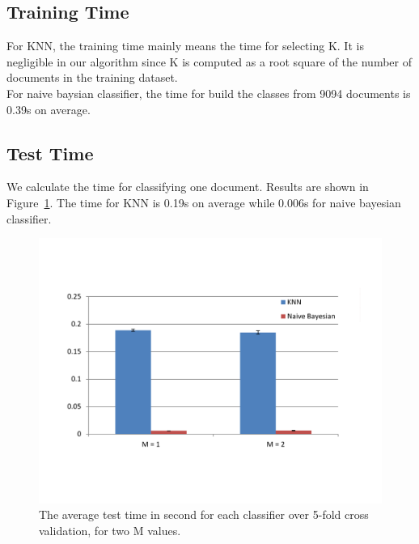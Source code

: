 \documentclass{article}
\begin{document}
\subsection{Training Time}
For KNN, the training time mainly means the time for selecting K. It is negligible in our algorithm since K is computed as a root square of the number of documents in the training dataset.\\
For naive baysian classifier, the time for build the classes from 9094 documents is 0.39s on average.
\subsection{Test Time}
We calculate the time for classifying one document. Results are shown in Figure~\ref{Fig:perf}. The time for KNN is 0.19s on average while 0.006s for naive bayesian classifier.


\begin{figure}
\includegraphics[width=1.0\textwidth]{TestTime}
\caption{The average test time in second for each classifier over 5-fold cross validation, for two M values.}
\label{Fig:perf}
\end{figure}
\end{document}
